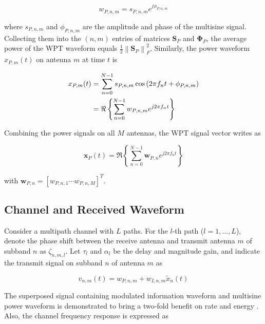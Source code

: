 \begin{equation}\label{eqn:unmodulated}
  {w_{P,n,m}} = {s_{P,n,m}}{e^{j{\phi _{P,n,m}}}}
\end{equation}

where ${s_{P,n,m}}$ and ${{\phi _{P,n,m}}}$ are the amplitude and phase of the multisine signal. Collecting them into the $(n,m)$ entries of matrices ${{\mathbf{S}}_P}$ and ${{\mathbf{\Phi }}_P}$, the average power of the WPT waveform equals $\frac{1}{2}\left\|\mathbf{S}_{P}\right\|_{F}^{2}$. Similarly, the power waveform ${x_{P,m}}(t)$ on antenna $m$ at time $t$ is

\begin{align}\label{eqn:power_waveform}
  {x_{P,m}}(t) &= \sum\limits_{n = 0}^{N - 1} {{s_{P,n,m}}\cos \left( {2\pi {f_n}t + {\phi _{P,n,m}}} \right)}  \hfill \\
   &= \Re \left\{ {\sum\limits_{n = 0}^{N - 1} {{w_{P,n,m}}{e^{j2\pi {f_n}t}}} } \right\} \hfill
\end{align}

Combining the power signals on all $M$ antennas, the WPT signal vector writes as

\begin{equation}\label{eqn:wpt_vector}
  {{\mathbf{x}}_P}(t) = \Re \left\{ {\sum\limits_{n = 0}^{N - 1} {{{\mathbf{w}}_{P,n}}} {e^{j2\pi {f_n}t}}} \right\}
\end{equation}

with ${{\mathbf{w}}_{P,n}} = {\left[ {{w_{P,n,1}} \cdots {w_{P,n,M}}} \right]^T}$.



\subsection{Channel and Received Waveform}\label{sec:multipath-and-received-signal}
Consider a multipath channel with $L$ paths. For the $l$-th path ($l = 1, \ldots ,L$), denote the phase shift between the receive antenna and transmit antenna $m$ of subband $n$ as ${\zeta _{n,m,l}}$. Let ${\tau _l}$ and ${\alpha _l}$ be the delay and magnitude gain, and indicate the transmit signal on subband $n$ of antenna $m$ as

\begin{equation}\label{eqn:superposed_waveform}
  {v_{n,m}}(t) = {w_{P,n,m}} + {w_{I,n,m}}{{\tilde x}_n}(t)
\end{equation}

The superposed signal containing modulated information waveform and multisine power waveform is demonstrated to bring a two-fold benefit on rate and energy \cite{Clerckx2019}. Also, the channel frequency response is expressed as

